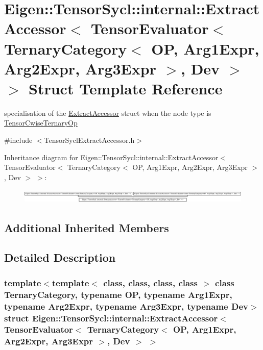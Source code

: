 \hypertarget{struct_eigen_1_1_tensor_sycl_1_1internal_1_1_extract_accessor_3_01_tensor_evaluator_3_01_ternaryb8a86dc87f8b1e563496a846ab6143f4}{}\section{Eigen\+:\+:Tensor\+Sycl\+:\+:internal\+:\+:Extract\+Accessor$<$ Tensor\+Evaluator$<$ Ternary\+Category$<$ OP, Arg1\+Expr, Arg2\+Expr, Arg3\+Expr $>$, Dev $>$ $>$ Struct Template Reference}
\label{struct_eigen_1_1_tensor_sycl_1_1internal_1_1_extract_accessor_3_01_tensor_evaluator_3_01_ternaryb8a86dc87f8b1e563496a846ab6143f4}


specialisation of the \hyperlink{struct_eigen_1_1_tensor_sycl_1_1internal_1_1_extract_accessor}{Extract\+Accessor} struct when the node type is \hyperlink{class_eigen_1_1_tensor_cwise_ternary_op}{Tensor\+Cwise\+Ternary\+Op}  




{\ttfamily \#include $<$Tensor\+Sycl\+Extract\+Accessor.\+h$>$}

Inheritance diagram for Eigen\+:\+:Tensor\+Sycl\+:\+:internal\+:\+:Extract\+Accessor$<$ Tensor\+Evaluator$<$ Ternary\+Category$<$ OP, Arg1\+Expr, Arg2\+Expr, Arg3\+Expr $>$, Dev $>$ $>$\+:\begin{figure}[H]
\begin{center}
\leavevmode
\includegraphics[height=0.695652cm]{struct_eigen_1_1_tensor_sycl_1_1internal_1_1_extract_accessor_3_01_tensor_evaluator_3_01_ternaryb8a86dc87f8b1e563496a846ab6143f4}
\end{center}
\end{figure}
\subsection*{Additional Inherited Members}


\subsection{Detailed Description}
\subsubsection*{template$<$template$<$ class, class, class, class $>$ class Ternary\+Category, typename OP, typename Arg1\+Expr, typename Arg2\+Expr, typename Arg3\+Expr, typename Dev$>$\newline
struct Eigen\+::\+Tensor\+Sycl\+::internal\+::\+Extract\+Accessor$<$ Tensor\+Evaluator$<$ Ternary\+Category$<$ O\+P, Arg1\+Expr, Arg2\+Expr, Arg3\+Expr $>$, Dev $>$ $>$}

